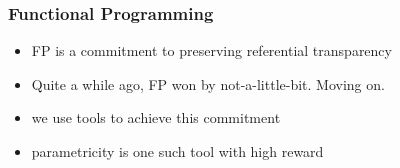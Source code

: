 \begin{frame}
\frametitle{Functional Programming}
\begin{itemize}
  \item<1-> FP is a commitment to preserving referential transparency
  \item<2-> Quite a while ago, FP won by not-a-little-bit. Moving on.
  \item<3-> we use tools to achieve this commitment
  \item<4-> parametricity is one such tool with high reward
\end{itemize}
\end{frame}
